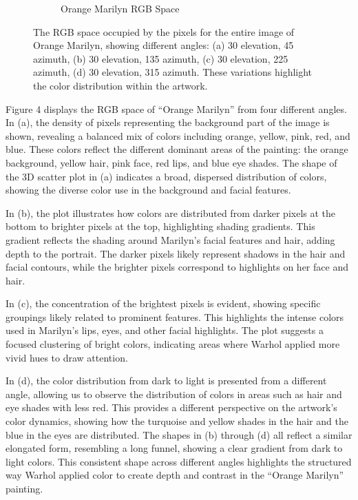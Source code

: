 \documentclass{article}
\begin{document}
\begin{figure}[ht]
\begin{subfigure}{0.45\textwidth}
    \caption{Orange Marilyn RGB Space }
    \label{fig:4_4_orange_marilyn_original_scatter}
  \end{subfigure}
  \caption{The RGB space occupied by the pixels for the entire image of Orange Marilyn, showing different angles: (a) 30 \degree elevation, 45 \degree azimuth, (b) 30 \degree elevation, 135 \degree azimuth, (c) 30 \degree elevation, 225 \degree azimuth, (d) 30 \degree elevation, 315 \degree azimuth. These variations highlight the color distribution within the artwork.}
  \label{fig:orange_marilyn_original_scatter_2}
\end{figure}

Figure 4 displays the RGB space of ``Orange Marilyn'' from four
different angles. In (a), the density of pixels representing the
background part of the image is shown, revealing a balanced mix of
colors including orange, yellow, pink, red, and blue. These colors
reflect the different dominant areas of the painting: the orange
background, yellow hair, pink face, red lips, and blue eye shades. The
shape of the 3D scatter plot in (a) indicates a broad, dispersed
distribution of colors, showing the diverse color use in the background
and facial features.

In (b), the plot illustrates how colors are distributed from darker
pixels at the bottom to brighter pixels at the top, highlighting shading
gradients. This gradient reflects the shading around Marilyn's facial
features and hair, adding depth to the portrait. The darker pixels
likely represent shadows in the hair and facial contours, while the
brighter pixels correspond to highlights on her face and hair.

In (c), the concentration of the brightest pixels is evident, showing
specific groupings likely related to prominent features. This highlights
the intense colors used in Marilyn's lips, eyes, and other facial
highlights. The plot suggests a focused clustering of bright colors,
indicating areas where Warhol applied more vivid hues to draw attention.

In (d), the color distribution from dark to light is presented from a
different angle, allowing us to observe the distribution of colors in
areas such as hair and eye shades with less red. This provides a
different perspective on the artwork's color dynamics, showing how the
turquoise and yellow shades in the hair and the blue in the eyes are
distributed. The shapes in (b) through (d) all reflect a similar
elongated form, resembling a long funnel, showing a clear gradient from
dark to light colors. This consistent shape across different angles
highlights the structured way Warhol applied color to create depth and
contrast in the ``Orange Marilyn'' painting.
\end{document}
